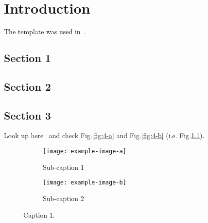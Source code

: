\documentclass[../main.tex]{subfiles}
\begin{document}
\chapter{Introduction} %

\label{Chapter1} %


\newcommand{\keyword}[1]{\textbf{#1}}
\newcommand{\tabhead}[1]{\textbf{#1}}
\newcommand{\code}[1]{\texttt{#1}}
\newcommand{\file}[1]{\texttt{\bfseries#1}}
\newcommand{\option}[1]{\texttt{\itshape#1}}


The template was used in~\cite{zorin_multimodal_2020}.


\section{Section 1}

\lipsum[1-3]



\section{Section 2}

\lipsum[1-5]


\section{Section 3}\label{section:label_section_3}

\lipsum[2-4]
Look up here~\cite{Zorin:22} and check Fig.\ref{fig:4-a} and Fig.\ref{fig:4-b} (i.e. Fig.\ref{fig:fig_1-1}).

\begin{figure}[ht]
\centering
    \begin{subfigure}[t]{.59\columnwidth}
      \texttt{[image: example-image-a]}
      \caption{Sub-caption 1}
    \end{subfigure}
    \begin{subfigure}[t]{.39\columnwidth}
      \texttt{[image: example-image-b]}
      \caption{Sub-caption 2}
    \end{subfigure}
    \caption{Caption 1.}
    \label{fig:fig_1-1}
\end{figure}
\end{document}
